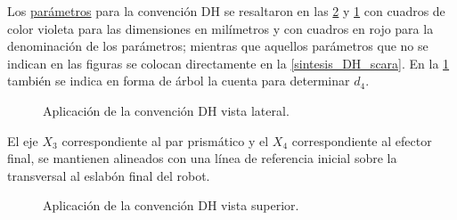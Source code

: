 \documentclass[a4paper,12pt]{article}
\begin{document}
Los \href{https://library.e.abb.com/public/bfb473ab8a774b01919d7f1b7f0fb8af/3HAC056431%20PS%20IRB%20910SC-es.pdf}{parámetros} para la convención DH se resaltaron en las \cref{DH_superior} y \cref{DH_lateral}
con cuadros de color violeta para las dimensiones en milímetros y con cuadros en rojo
para la denominación de los parámetros; mientras que aquellos parámetros que no se indican en las figuras
se colocan directamente en la \cref{sintesis_DH_scara}. En la \cref{DH_lateral} también se indica en forma
de árbol la cuenta para determinar $d_4$.

\begin{figure}[H]
    \centering
    \begin{adjustbox}{scale = 0.66, max width=\columnwidth}
    \end{adjustbox}
    \caption{Aplicación de la convención DH vista lateral.}
    \label{DH_lateral}
\end{figure}

El eje $X_3$ correspondiente al par prismático y el $X_4$ correspondiente al efector final, se mantienen alineados
con una línea de referencia inicial sobre la transversal al eslabón final del robot.

\begin{figure}[H]
    \centering
    \begin{adjustbox}{scale = 0.6, max width=\columnwidth}
    \end{adjustbox}
    \caption{Aplicación de la convención DH vista superior.}
    \label{DH_superior}
\end{figure}
\end{document}
